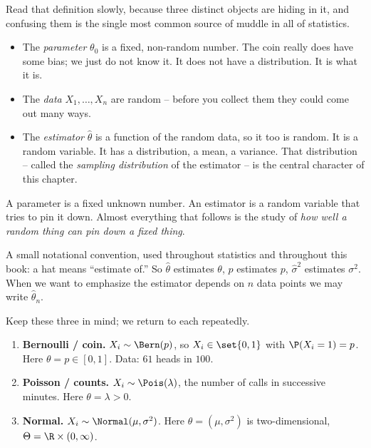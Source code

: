 Read that definition slowly, because three distinct objects are hiding in it,
and confusing them is the single most common source of muddle in all of
statistics.

\begin{itemize}
\item The \emph{parameter} $\theta_0$ is a fixed, non-random number. The coin
  really does have some bias; we just do not know it. It does not have a
  distribution. It is what it is.
\item The \emph{data} $X_1,\dots,X_n$ are random -- before you collect them they
  could come out many ways.
\item The \emph{estimator} $\hat\theta$ is a function of the random data, so it
  too is random. It is a random variable. It has a distribution, a mean, a
  variance. That distribution -- called the \emph{sampling distribution} of the
  estimator -- is the central character of this chapter.
\end{itemize}

\begin{focusbox}
A parameter is a fixed unknown number. An estimator is a random variable that
tries to pin it down. Almost everything that follows is the study of \emph{how
well a random thing can pin down a fixed thing}.
\end{focusbox}

A small notational convention, used throughout statistics and throughout this
book: a hat means ``estimate of.'' So $\hat\theta$ estimates $\theta$,
$\hat p$ estimates $p$, $\hat\sigma^2$ estimates $\sigma^2$. When we want to
emphasize the estimator depends on $n$ data points we may write $\hat\theta_n$.

\begin{example}
\label{ch30:ex-three-models}
Keep these three in mind; we return to each repeatedly.
\begin{enumerate}
\item \textbf{Bernoulli / coin.} $X_i \sim \Bern(p)$, so $X_i \in \set{0,1}$
  with $\P(X_i=1)=p$. Here $\theta = p \in [0,1]$. Data: $61$ heads in $100$.
\item \textbf{Poisson / counts.} $X_i \sim \Pois(\lambda)$, the number of calls
  in successive minutes. Here $\theta = \lambda > 0$.
\item \textbf{Normal.} $X_i \sim \Normal(\mu,\sigma^2)$. Here
  $\theta = (\mu,\sigma^2)$ is two-dimensional, $\Theta = \R \times (0,\infty)$.
\end{enumerate}
\end{example}

